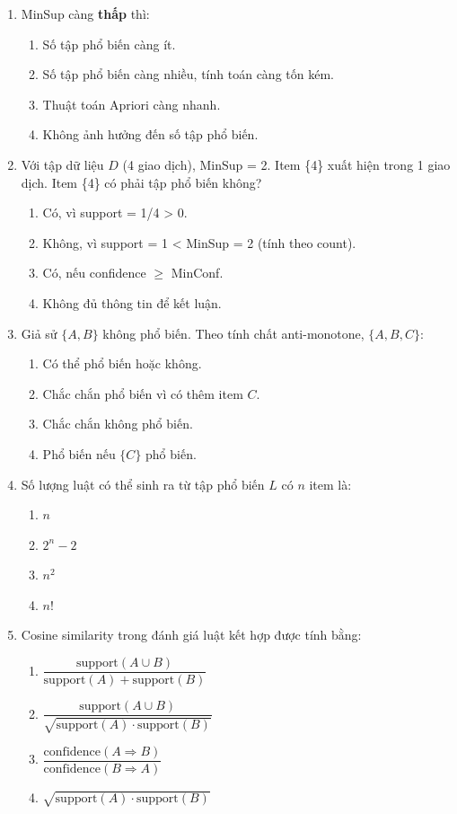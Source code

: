 \documentclass[10pt]{article}
\begin{document}
\begin{enumerate}[leftmargin=*, label=\textbf{Câu \arabic*.}]
    \item MinSup càng \textbf{thấp} thì:
    \begin{enumerate}[label=\Alph*.]
        \item Số tập phổ biến càng ít.
        \item Số tập phổ biến càng nhiều, tính toán càng tốn kém.
        \item Thuật toán Apriori càng nhanh.
        \item Không ảnh hưởng đến số tập phổ biến.
    \end{enumerate}

    \item Với tập dữ liệu $D$ (4 giao dịch), MinSup = 2. Item \{4\} xuất hiện trong 1 giao dịch. Item \{4\} có phải tập phổ biến không?
    \begin{enumerate}[label=\Alph*.]
        \item Có, vì support = 1/4 > 0.
        \item Không, vì support = 1 < MinSup = 2 (tính theo count).
        \item Có, nếu confidence $\geq$ MinConf.
        \item Không đủ thông tin để kết luận.
    \end{enumerate}

    \item Giả sử $\{A, B\}$ không phổ biến. Theo tính chất anti-monotone, $\{A, B, C\}$:
    \begin{enumerate}[label=\Alph*.]
        \item Có thể phổ biến hoặc không.
        \item Chắc chắn phổ biến vì có thêm item $C$.
        \item Chắc chắn không phổ biến.
        \item Phổ biến nếu $\{C\}$ phổ biến.
    \end{enumerate}

    \item Số lượng luật có thể sinh ra từ tập phổ biến $L$ có $n$ item là:
    \begin{enumerate}[label=\Alph*.]
        \item $n$
        \item $2^n - 2$
        \item $n^2$
        \item $n!$
    \end{enumerate}

    \item Cosine similarity trong đánh giá luật kết hợp được tính bằng:
    \begin{enumerate}[label=\Alph*.]
        \item $\dfrac{\text{support}(A \cup B)}{\text{support}(A) + \text{support}(B)}$
        \item $\dfrac{\text{support}(A \cup B)}{\sqrt{\text{support}(A) \cdot \text{support}(B)}}$
        \item $\dfrac{\text{confidence}(A \Rightarrow B)}{\text{confidence}(B \Rightarrow A)}$
        \item $\sqrt{\text{support}(A) \cdot \text{support}(B)}$
    \end{enumerate}


\end{enumerate}
\end{document}
